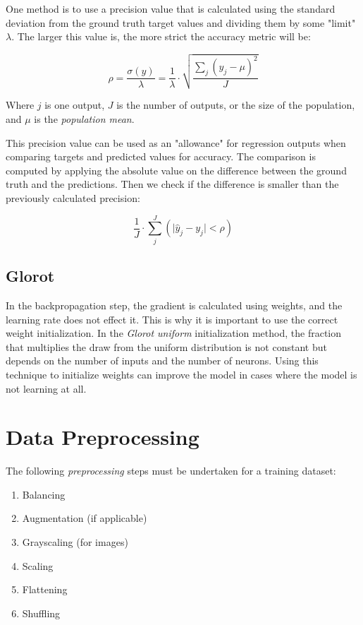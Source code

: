 \documentclass[a4paper]{article}
\newcommand{\abs}[1]{\lvert#1\rvert}
\begin{document}
One method is to use a precision value that is calculated using the standard deviation from the ground truth target values and dividing them by some "limit" $\lambda$. The larger this value is, the more strict the accuracy metric will be:

\begin{equation*}
    \rho = \frac{\sigma(y)}{\lambda} = \frac{1}{\lambda} \cdot \sqrt{\frac{\sum_j(y_j-\mu)^2}{J}}
\end{equation*}

Where $j$ is one output, $J$ is the number of outputs, or the size of the population, and $
\mu$ is the \emph{population mean}.

This precision value can be used as an "allowance" for regression outputs when comparing targets and predicted values for accuracy. The comparison is computed by applying the absolute value on the difference between the ground truth and the predictions. Then we check if the difference is smaller than the previously calculated precision:

\begin{equation*}
    \frac{1}{J} \cdot \sum_j^J(\abs{\hat{y}_j-y_j} < \rho)
\end{equation*}

\subsection*{Glorot}
In the backpropagation step, the gradient is calculated using weights, and the learning rate does not effect it. This is why it is important to use the correct weight initialization. In the \emph{Glorot uniform} initialization method, the fraction that multiplies the draw from the uniform distribution is not constant but depends on the number of inputs and the number of neurons. Using this technique to initialize weights can improve the model in cases where the model is not learning at all.


\section*{Data Preprocessing}
The following \emph{preprocessing} steps must be undertaken for a training dataset:

\begin{enumerate}
    \item Balancing
    \item Augmentation (if applicable)
    \item Grayscaling (for images)
    \item Scaling
    \item Flattening
    \item Shuffling
\end{enumerate}
\end{document}
